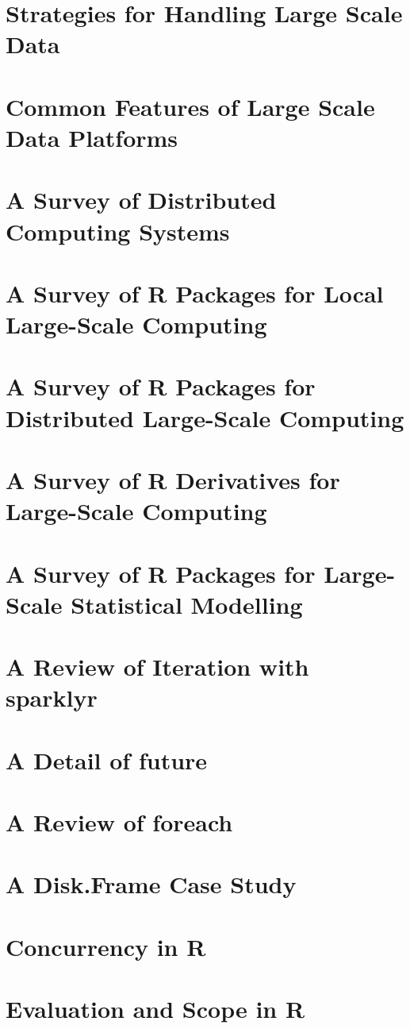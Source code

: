 
\section{Strategies for Handling Large Scale Data}

\section{Common Features of Large Scale Data Platforms}

\section{A Survey of Distributed Computing Systems}

\section{A Survey of R Packages for Local Large-Scale Computing}

\section{A Survey of R Packages for Distributed Large-Scale Computing}

\section{A Survey of R Derivatives for Large-Scale Computing}

\section{A Survey of R Packages for Large-Scale Statistical Modelling}

\section{A Review of Iteration with sparklyr}

\section{A Detail of future}

\section{A Review of foreach}

\section{A Disk.Frame Case Study}

\section{Concurrency in R}

\section{Evaluation and Scope in R}

